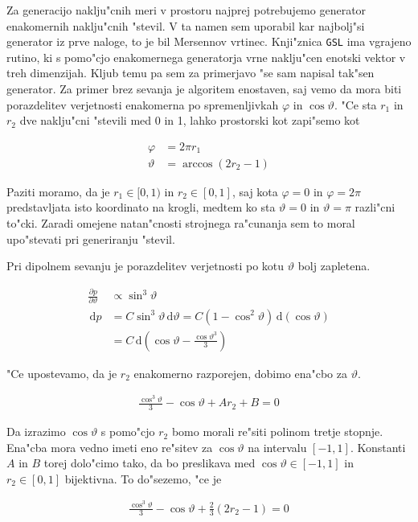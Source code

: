 \documentclass[a4paper,10pt]{article}
\newcommand{\dd}{\,\mathrm{d}}
\begin{document}
Za generacijo naklju"cnih meri v prostoru najprej potrebujemo generator enakomernih naklju"cnih "stevil. V ta namen sem uporabil kar najbolj"si generator iz prve naloge, to je bil Mersennov vrtinec. Knji"znica \texttt{GSL} ima vgrajeno rutino, ki s pomo"cjo enakomernega generatorja vrne naklju"cen enotski vektor v treh dimenzijah. Kljub temu pa sem za primerjavo "se sam napisal tak"sen generator. Za primer brez sevanja je algoritem enostaven, saj vemo da mora biti porazdelitev verjetnosti enakomerna po spremenljivkah $\varphi$ in $\cos\vartheta$. "Ce sta $r_1$ in $r_2$ dve naklju"cni "stevili med 0 in 1, lahko prostorski kot zapi"semo kot

\begin{align}
 \varphi &= 2\pi r_1 \label{eq:ran-smer-phi}\\
 \vartheta &= \arccos (2r_2-1) \label{eq:ran-smer-theta}
\end{align}

Paziti moramo, da je $r_1 \in [0,1)$ in $r_2 \in [0,1]$, saj kota $\varphi = 0$ in $\varphi = 2\pi$ predstavljata isto koordinato na krogli, medtem ko sta $\vartheta=0$ in $\vartheta=\pi$ razli"cni to"cki. Zaradi omejene natan"cnosti strojnega ra"cunanja sem to moral upo"stevati pri generiranju "stevil. 

Pri dipolnem sevanju je porazdelitev verjetnosti po kotu $\vartheta$ bolj zapletena. 

\begin{align}
 \frac{\partial p}{\partial \vartheta} & \propto \sin^3\vartheta \\
  \dd p &= C \sin^3 \vartheta \dd \vartheta = C(1-\cos^2\vartheta) \dd (\cos\vartheta) \\
&= C \dd\left( \cos\vartheta - \frac{\cos\vartheta^3}{3} \right)
\end{align}

"Ce upostevamo, da je $r_2$ enakomerno razporejen, dobimo ena"cbo za $\vartheta$. 

\begin{align}
\frac{\cos^3\vartheta}{3} - \cos\vartheta + Ar_2 + B = 0
\end{align}

Da izrazimo $\cos\vartheta$ s pomo"cjo $r_2$ bomo morali re"siti polinom tretje stopnje. Ena"cba mora vedno imeti eno re"sitev za $\cos\vartheta$ na intervalu $[-1,1]$. Konstanti $A$ in $B$ torej dolo"cimo tako, da bo preslikava med $\cos\vartheta\in[-1,1]$ in $r_2\in[0,1]$ bijektivna. To do"sezemo, "ce je 

\begin{align}
\frac{\cos^3\vartheta}{3} - \cos\vartheta + \frac{2}{3}(2r_2 -1) = 0
\end{align}
\end{document}

